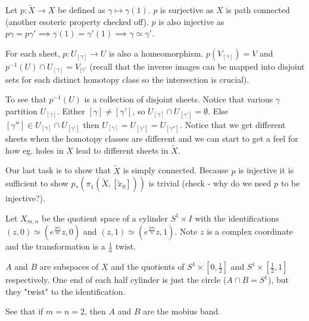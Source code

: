 \documentclass[10pt]{article}
\begin{document}
\begin{example}
	Let $p: \tilde{X} \to X$ be defined as $\gamma \mapsto \gamma(1)$. $p$ is
	surjective as $X$ is path connected (another esoteric property checked off).
	$p$ is also injective as $p\gamma = p\gamma' \implies \gamma(1) = \gamma'(1)
	\implies \gamma \simeq \gamma'$. 

	For each sheet, $p: U_{[\gamma]} \to U$ is also a homeomorphism. 
	$p(V_{[\gamma]}) = V$ and $p^{-1}(U) \cap U_{[\gamma]} = V_{[\gamma'}$ (recall that the
	inverse images can be mapped into disjoint sets for each distinct homotopy
	class so the intersection is crucial).

	To see that $p^{-1}(U)$ is a collection of disjoint sheets. Notice that
	various $\gamma$ partition $U_{[\gamma]}$. Either $[\gamma] \neq [\gamma']$,
	so $U_{[\gamma]} \cap U_{[\gamma']} = \emptyset$. Else $[\gamma''] \in
	U_{[\gamma]} \cap U_{[\gamma']}$ then $U_{[\gamma]} = U_{[\gamma']} =
	U_{[\gamma'']}$. Notice that we get different sheets when the homotopy
	classes are different and we can start to get a feel for how eg. holes in $X$
	lead to different sheets in $\tilde{X}$.

	Our last task is to show that $\tilde{X}$ is simply connected. Because $p$ is
	injective it is sufficient to show $p_*(\pi_1(\tilde{X}, [\tilde{x}_0]))$ is
	trivial (check - why do we need $p$ to be injective?).
\end{example}

\begin{example}
	Let $X_{m,n}$ be the quotient space of a cylinder $S^1 \times I$ with the
identifications $(z, 0) \simeq (e^{\frac{2\pi i}{m}}z, 0)$ and $(z, 1) \simeq
(e^{\frac{2\pi i}{n}}z, 1)$. Note $z$ is a complex coordinate and the
transformation is a $\frac{1}{n}$ twist.

	$A$ and $B$ are subspaces of $X$ and the quotients of $S^1 \times [0, \frac{1}{2}]$ and $S^1
	\times [\frac{1}{2}, 1]$ respectively. One end of each half cylinder is just
	the circle ($A \cap B = S^1$), but they "twist" to the identification.

	See that if $m = n = 2$, then $A$ and $B$ are the mobius band.


\end{example}
\end{document}
